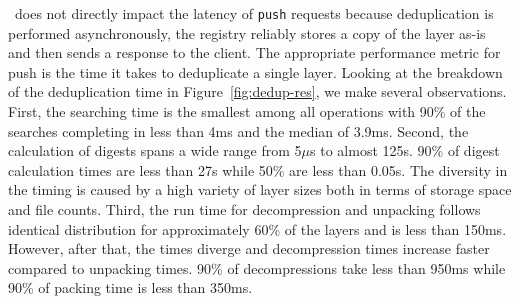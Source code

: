 \sysname\ does not directly impact the latency of \texttt{push} requests because
deduplication is performed asynchronously, \ie the registry reliably stores a
copy of the layer as-is and then sends a response to the client.
%
The appropriate performance metric for push is the time it takes to deduplicate
a single layer.
%
%
%
Looking at the breakdown of the deduplication time in
Figure~\ref{fig:dedup-res}, we make several observations.
%
First, the searching time is the smallest among all operations with 90\% of the
searches completing in less than 4ms and the median of 3.9ms.
%
%
%
Second, the calculation of digests spans a wide range from 5$\mu$s to almost
125s.
%
%
%
%
90\% of digest calculation times are less than 27s while 50\% are
less than 0.05s.
%
The diversity in the timing is caused by a high variety of layer sizes both in
terms of storage space and file counts.
%
%
%
Third, the run time for decompression and unpacking follows identical
distribution for approximately 60\% of the layers and is less than 150ms.
%
%
However, after that, the times diverge and decompression times increase faster
compared to unpacking times.
%
%
90\% of decompressions take less than 950ms while 90\% of packing time is less
than 350ms.

